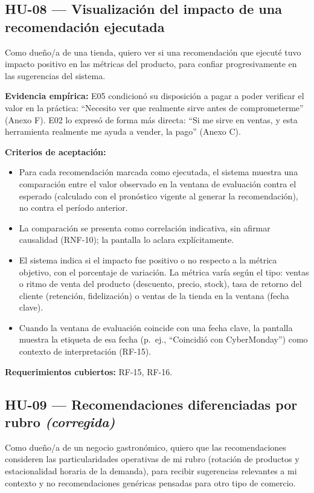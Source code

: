 \subsection{HU-08 --- Visualización del impacto de una recomendación ejecutada}
\label{sec:hu-08}

Como dueño/a de una tienda, quiero ver si una recomendación que ejecuté tuvo impacto positivo en las métricas del producto, para confiar progresivamente en las sugerencias del sistema.

\noindent\textbf{Evidencia empírica:} E05 condicionó su disposición a pagar a poder verificar el valor en la práctica: \enquote{Necesito ver que realmente sirve antes de comprometerme} (Anexo F). E02 lo expresó de forma más directa: \enquote{Si me sirve en ventas, y esta herramienta realmente me ayuda a vender, la pago} (Anexo C).

\noindent\textbf{Criterios de aceptación:}
\begin{itemize}
    \item Para cada recomendación marcada como ejecutada, el sistema muestra una comparación entre el valor observado en la ventana de evaluación contra el esperado (calculado con el pronóstico vigente al generar la recomendación), no contra el período anterior.
    \item La comparación se presenta como correlación indicativa, sin afirmar causalidad (RNF-10); la pantalla lo aclara explícitamente.
    \item El sistema indica si el impacto fue positivo o no respecto a la métrica objetivo, con el porcentaje de variación. La métrica varía según el tipo: ventas o ritmo de venta del producto (descuento, precio, stock), tasa de retorno del cliente (retención, fidelización) o ventas de la tienda en la ventana (fecha clave).
    \item Cuando la ventana de evaluación coincide con una fecha clave, la pantalla muestra la etiqueta de esa fecha (p.~ej., \enquote{Coincidió con CyberMonday}) como contexto de interpretación (RF-15).
\end{itemize}

\noindent\textbf{Requerimientos cubiertos:} RF-15, RF-16.

\subsection{HU-09 --- Recomendaciones diferenciadas por rubro \textit{(corregida)}}
\label{sec:hu-09}

Como dueño/a de un negocio gastronómico, quiero que las recomendaciones consideren las particularidades operativas de mi rubro (rotación de productos y estacionalidad horaria de la demanda), para recibir sugerencias relevantes a mi contexto y no recomendaciones genéricas pensadas para otro tipo de comercio.

